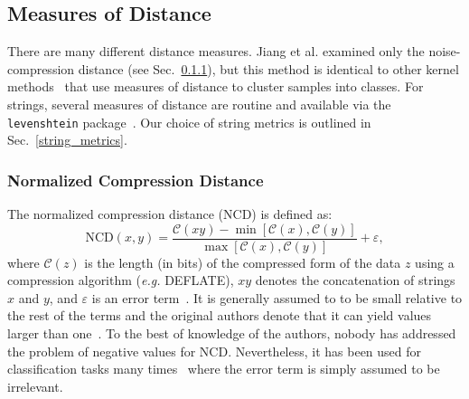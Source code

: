 \documentclass[conference]{IEEEtran}
\begin{document}
\subsection{Measures of Distance}
There are many different distance measures. Jiang et al. examined only the noise-compression distance (see Sec.~\ref{ncd}), but this method is identical to other kernel methods~\cite{} that use measures of distance to cluster samples into classes. For strings, several measures of distance are routine and available via the \texttt{levenshtein} package~\cite{levenshtein}. Our choice of string metrics is outlined in Sec.~\ref{string_metrics}.






\subsubsection{Normalized Compression Distance}
\label{ncd}
The normalized compression distance (NCD) is defined as:
\begin{equation}
    \text{NCD}(x, y) = \frac{\mathcal{C}(xy) - \min[\mathcal{C}(x), \mathcal{C}(y)]}{\max[\mathcal{C}(x), \mathcal{C}(y)]} + \varepsilon,
\end{equation}
where $\mathcal{C}(z)$ is the length (in bits) of the compressed form of the data $z$ using a compression algorithm (\textit{e.g.} DEFLATE), $xy$ denotes the concatenation of strings $x$ and $y$, and $\varepsilon$ is an error term~\cite{ncd}. It is generally assumed to to be small relative to the rest of the terms and the original authors denote that it can yield values larger than one~\cite{ncd}. To the best of knowledge of the authors, nobody has addressed the problem of negative values for NCD\@.
Nevertheless, it has been used for classification tasks many times~\cite{opitz2023gzip,weinreich2023parameter,nishida2011tweet,jiang2022less} where the error term is simply assumed to be irrelevant. 
\end{document}
